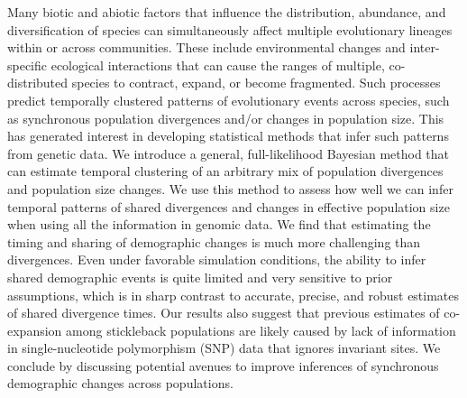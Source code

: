 Many biotic and abiotic factors that influence the distribution, abundance, and
diversification of species can simultaneously affect multiple evolutionary
lineages within or across communities.
These include environmental changes and inter-specific ecological interactions
that can cause the ranges of multiple, co-distributed species to contract,
expand, or become fragmented.
Such processes predict temporally clustered patterns of evolutionary events
across species, such as synchronous population divergences and/or changes in
population size.
This has generated interest in developing statistical methods that infer such
patterns from genetic data.
We introduce a general, full-likelihood Bayesian method that can estimate
temporal clustering of an arbitrary mix of population divergences and
population size changes.
We use this method to assess how well we can infer temporal patterns of shared
divergences and changes in effective population size when using all the
information in genomic data.
We find that estimating the timing and sharing of demographic changes is much
more challenging than divergences.
Even under favorable simulation conditions, the ability to infer shared
demographic events is quite limited and very sensitive to prior assumptions,
which is in sharp contrast to accurate, precise, and robust estimates of shared
divergence times.
Our results also suggest that previous estimates of co-expansion among
stickleback populations are likely caused by lack of information in
single-nucleotide polymorphism (SNP) data that ignores invariant sites.
We conclude by discussing potential avenues to improve inferences of
synchronous demographic changes across populations.
